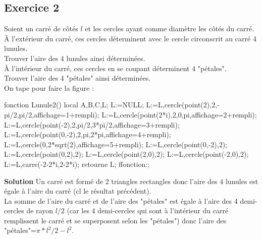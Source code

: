 \documentclass[12pt,a4paper]{book}
\begin{document}
\begin{giacjshere}
\subsection{Exercice 2}
Soient un carr\'e de c\^ot\'es $l$ et les cercles ayant comme 
diam\`etre les c\^ot\'es du carr\'e.\\
\`A l'ext\'erieur du carr\'e, ces cercles d\'eterminent avec le cercle 
circonscrit au carr\'e 4 lunules.\\
Trouver l'aire des 4 lunules ainsi d\'etermin\'ees.\\
\`A l'int\'erieur du carr\'e, ces cercles en se coupant d\'eterminent 4 
"p\'etales".\\
 Trouver l'aire des 4 "p\'etales" ainsi d\'etermin\'ees.\\
On tape pour faire la figure :
\begin{giaconload}
fonction Lunule2()
local A,B,C,L;
L:=NULL;
L:=L,cercle(point(2),2,-pi/2,pi/2,affichage=1+rempli);
L:=L,cercle(point(2*i),2,0,pi,affichage=2+rempli);
L:=L,cercle(point(-2),2,pi/2,3*pi/2,affichage=3+rempli);
L:=L,cercle(point(0,-2),2,pi,2*pi,affichage=4+rempli);
L:=L,cercle(0,2*sqrt(2),affichage=5+rempli);
L:=L,cercle(point(0,-2),2);
L:=L,cercle(point(0,2),2);
L:=L,cercle(point(2,0),2);
L:=L,cercle(point(-2,0),2);
L:=L,carre(-2-2*i,2-2*i);
retourne L;
ffonction:;
\end{giaconload}
{\bf Solution}
Un carr\'e est form\'e de 2 triangles rectangles donc l'aire des 4 lunules est 
\'egale \`a l'aire du carr\'e (cl le r\'esultat pr\'ec\'edent).\\
La somme de l'aire du carr\'e et de  l'aire des "p\'etales" est \'egale \`a 
l'aire des 4 demi-cercles de rayon $l/2$ (car les 4 demi-cercles qui sont \`a 
l'int\'erieur du carr\'e remplissent le carr\'e et se superposent selon les 
"p\'etales") donc l'aire des "p\'etales"=$\pi*l^2/2-l^2$.


\end{giacjshere}
\end{document}

